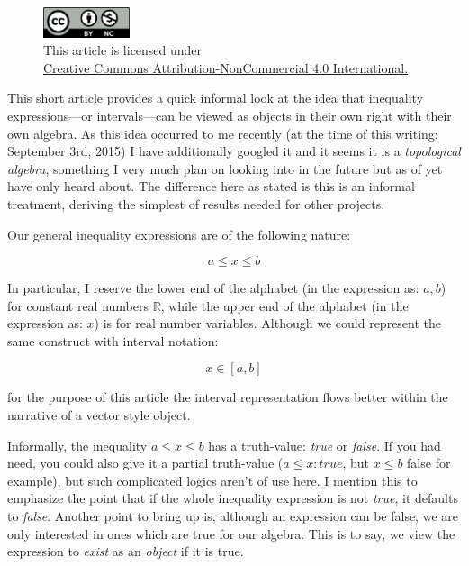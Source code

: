 \documentclass[twoside]{article}
\begin{document}
\begin{figure}[h]
\centering
\includegraphics[width=1in]{cc-by-nc.png}\\[0.1in]
\tiny This article is licensed under \\
\href{http://creativecommons.org/licenses/by-nc/4.0/}
{Creative Commons Attribution-NonCommercial 4.0 International.}\\[0.3in]
\end{figure}

This short article provides a quick informal look at the idea that inequality expressions---or intervals---can be viewed
as objects in their own right with their own algebra. As this idea occurred to me recently (at the time of this writing:
September 3rd, 2015) I have additionally googled it and it seems it is a \emph{topological algebra}, something I very much
plan on looking into in the future but as of yet have only heard about. The difference here as stated is this is an informal
treatment, deriving the simplest of results needed for other projects.

Our general inequality expressions are of the following nature:

$$ a\le x\le b $$

In particular, I reserve the lower end of the alphabet (in the expression as: $ a, b $) for constant real numbers $ \mathbb{R} $,
while the upper end of the alphabet (in the expression as: $ x $) is for real number variables. Although we could represent the
same construct with interval notation:

$$ x\in[a,b] $$

for the purpose of this article the interval representation flows better within the narrative of a vector style object.

Informally, the inequality $ a\le x\le b $ has a truth-value: \emph{true} or \emph{false}. If you had need, you could also
give it a partial truth-value ($ a\le x: true $, but $ x\le b $ false for example), but such complicated logics aren't of use
here.  I mention this to emphasize the point that if the whole inequality expression is not \emph{true}, it defaults to
\emph{false}.  Another point to bring up is, although an expression can be false, we are only interested in ones which
are true for our algebra. This is to say, we view the expression to \emph{exist} as an \emph{object} if it is true.
\end{document}
